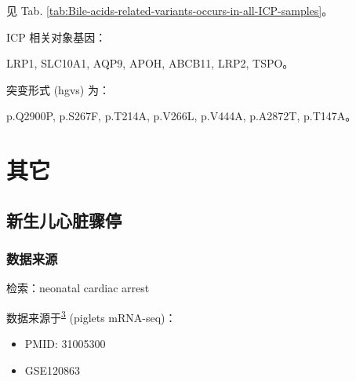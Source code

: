 \documentclass[
]{article}
\providecommand{\tightlist}{%
  \setlength{\itemsep}{0pt}\setlength{\parskip}{0pt}}
\begin{document}
见 Tab. \ref{tab:Bile-acids-related-variants-occurs-in-all-ICP-samples}。

ICP 相关对象基因：

LRP1, SLC10A1, AQP9, APOH, ABCB11, LRP2, TSPO。

突变形式 (hgvs) 为：

p.Q2900P, p.S267F, p.T214A, p.V266L, p.V444A, p.A2872T, p.T147A。

\hypertarget{ux5176ux5b83}{%
\section{其它}\label{ux5176ux5b83}}

\hypertarget{ux65b0ux751fux513fux5fc3ux810fux9aa4ux505c}{%
\subsection{新生儿心脏骤停}\label{ux65b0ux751fux513fux5fc3ux810fux9aa4ux505c}}

\hypertarget{ux6570ux636eux6765ux6e90}{%
\subsubsection{数据来源}\label{ux6570ux636eux6765ux6e90}}

检索：neonatal cardiac arrest

数据来源于\textsuperscript{\protect\hyperlink{ref-TranscriptomePTuLa2019}{3}} (piglets mRNA-seq)：

\begin{itemize}
\tightlist
\item
  PMID: 31005300
\item
  GSE120863
\end{itemize}
\end{document}
